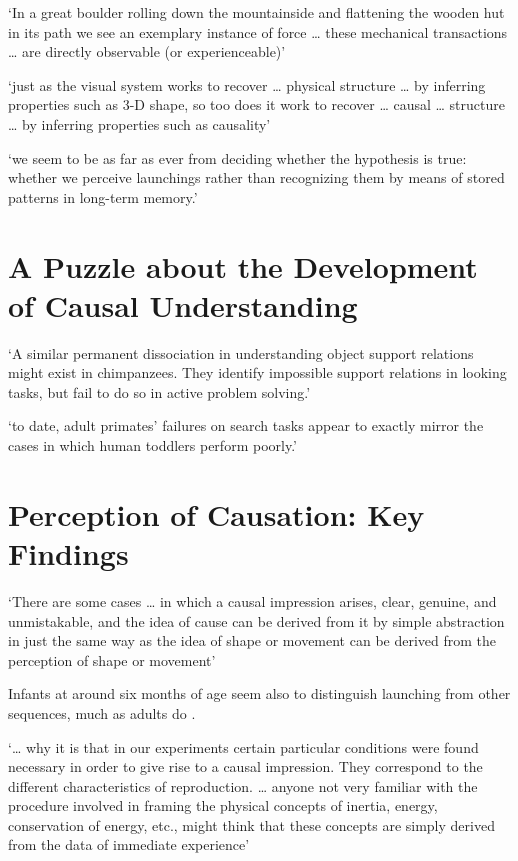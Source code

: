 \documentclass[12pt]{extarticle}
\begin{document}
\begin{multicols*}{3}
‘In a great boulder rolling down the mountainside and flattening the wooden hut in its path we see an exemplary instance of force … these mechanical transactions … are directly observable (or experienceable)’
\citep[p.~118]{Strawson:1992yh}

‘just as the visual system works to recover … physical structure … by inferring properties such as 3-D shape, so too does it work to recover … causal … structure … by inferring properties such as causality’
\citep[p.~299]{Scholl:2000eq}

‘we seem to be as far as ever from deciding whether the hypothesis is
true: whether we perceive launchings rather than recognizing them by
means of stored patterns in long-term memory.’
\citep[p.~92]{rips:2011_causation}





\section{A Puzzle about the Development of Causal Understanding}

‘A similar permanent dissociation in understanding object support relations
            might exist in chimpanzees. They identify impossible support relations in looking tasks,
            but fail to do so in active problem solving.’
\citep{gomez:2005_species}

‘to date, adult primates’ failures on search tasks appear to
            exactly mirror the cases in which human toddlers perform poorly.’
\citep[p.\ 17]{santos:2009_object}



\section{Perception of Causation: Key Findings}

‘There are some cases … in which a causal impression arises, clear, genuine, and unmistakable,
and the idea of cause can be derived from it by simple abstraction in just the same way as the
idea of shape or movement can be derived from the perception of shape or movement’
\citep[p.\ 270--1]{Michotte:1946nz}

Infants at around six months of age seem also to distinguish launching from other sequences,
much as adults do \citep{Leslie:1987nr}.

‘… why it is that in our experiments certain particular conditions were
found necessary in order to give rise to a causal impression. They
correspond to the different characteristics of reproduction. …
anyone not very familiar with the procedure involved in framing the
physical concepts of inertia, energy, conservation of energy, etc., might
think that these concepts are simply derived from the data of immediate
experience’
\citep{Michotte:1946nz}




\end{multicols*}
\end{document}
